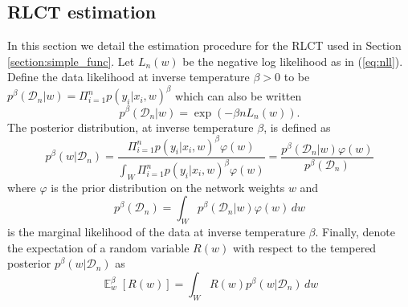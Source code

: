 \documentclass[11pt]{article}
\DeclareMathOperator*{\E}{\operatorname{\mathbb{E}}}
\numberwithin{equation}{section}
\theoremstyle{plain}
\theoremstyle{definition}
\begin{document}
\subsection{RLCT estimation} \label{appendix:RLCT_estimation}


In this section we detail the estimation procedure for the RLCT used in Section \ref{section:simple_func}. Let $L_n(w)$ be the negative log likelihood as in (\ref{eq:nll}). Define the data likelihood at inverse temperature $\beta >0$ to be $p^\beta(\mathcal D_n | w) = \Pi_{i=1}^n p(y_i |x_i, w)^\beta$ which can also be written 
\begin{equation}
	p^\beta(\mathcal D_n | w) = \exp(-\beta n L_n(w)).
	\label{general_likelihood}
\end{equation}
The posterior distribution, at inverse temperature $\beta$, is defined as 
\begin{equation}
	p^\beta(w|\mathcal D_n) = \frac{\Pi_{i=1}^n p(y_i|x_i,w)^\beta \varphi(w)}{\int_W \Pi_{i=1}^n p(y_i|x_i,w)^\beta \varphi(w)} = \frac{p^\beta(\mathcal D_n|w) \varphi(w)}{p^\beta(\mathcal D_n)}
	\label{general_posterior}
\end{equation}
where $\varphi$ is the prior distribution on the network weights $w$ and
\begin{equation}
	p^\beta(\mathcal D_n) = \int_W p^\beta(\mathcal D_n|w) \varphi(w) \,dw
	\label{general_marginal_likelihood}
\end{equation}
is the marginal likelihood of the data at inverse temperature $\beta$. 
Finally, denote the expectation of a random variable $R(w)$ with respect to the tempered posterior $p^\beta(w|\mathcal D_n)$ as
\begin{equation}
	{\E}_w^\beta [R(w)] = \int_W R(w) p^\beta(w|\mathcal D_n) \,dw
	\label{general_expectation_posterior}
\end{equation}
\end{document}
